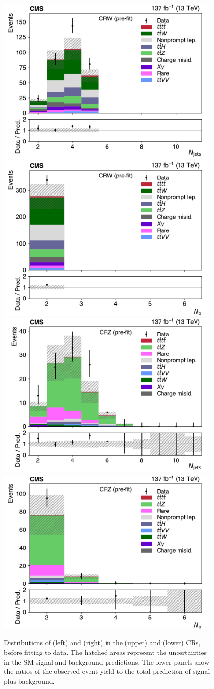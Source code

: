 \begin{figure}[!hbt]
\centering
\includegraphics[width=.49\textwidth]{figs/ftp/ttwcr_njets_prefit.pdf}
\includegraphics[width=.49\textwidth]{figs/ftp/ttwcr_nbtags_prefit.pdf}
\includegraphics[width=.49\textwidth]{figs/ftp/ttzcr_njets_prefit.pdf}
\includegraphics[width=.49\textwidth]{figs/ftp/ttzcr_nbtags_prefit.pdf}
    \caption{Distributions of \Njets (left) and \Nbjets (right) in the \ttW (upper) and \ttZ (lower) CRs, before fitting to data.
The hatched areas represent the  uncertainties in the SM signal and background predictions.
 The lower panels show the ratios of the observed event yield to the total prediction of
    signal plus background.
    }
\label{fig:kinemcr}
\end{figure}

